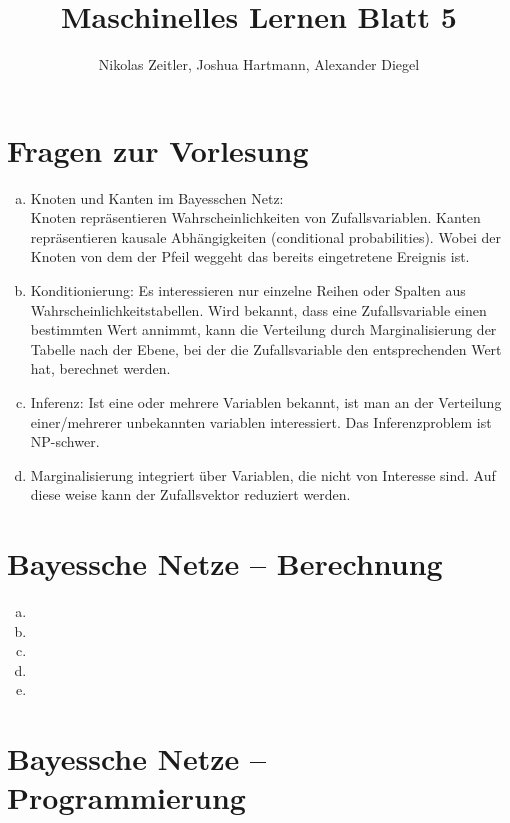 \documentclass[a4paper]{scrartcl}
\author{Nikolas Zeitler, Joshua Hartmann, Alexander Diegel}
\title{Maschinelles Lernen Blatt 5}
\begin{document}
\maketitle
\section{Fragen zur Vorlesung}
%
\begin{enumerate}[a)]
	\item Knoten und Kanten im Bayesschen Netz:\\
	Knoten repräsentieren Wahrscheinlichkeiten von Zufallsvariablen.
	Kanten repräsentieren kausale Abhängigkeiten (conditional probabilities). Wobei der Knoten von dem der Pfeil weggeht das bereits eingetretene Ereignis ist. 
	\item Konditionierung: Es interessieren nur einzelne Reihen oder Spalten aus Wahrscheinlichkeitstabellen. Wird bekannt, dass eine Zufallsvariable einen bestimmten Wert annimmt, kann die Verteilung durch Marginalisierung der Tabelle nach der Ebene, bei der die Zufallsvariable den entsprechenden Wert hat, berechnet werden.
	
	\item Inferenz: Ist eine oder mehrere Variablen bekannt, ist man an der Verteilung einer/mehrerer unbekannten variablen interessiert. Das Inferenzproblem ist NP-schwer.
	
	\item Marginalisierung integriert über Variablen, die nicht von Interesse sind. Auf diese weise kann der Zufallsvektor reduziert werden.
\end{enumerate}


\section{Bayessche Netze – Berechnung}

\begin{enumerate}[(a)]
	\item 
	\item 
	\item 
	\item 
	\item 
\end{enumerate}


\section{Bayessche Netze – Programmierung}
\end{document}
